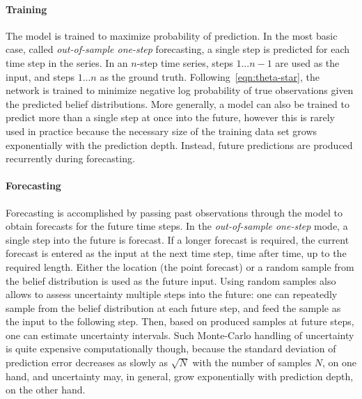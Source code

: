 \documentclass[runningheads]{llncs}
\begin{document}
\paragraph{Training} The model is trained to maximize
probability of prediction. In the most basic case, called
\textit{out-of-sample one-step} forecasting, a single step
is predicted for each time step in the series. In an $n$-step
time series, steps $1 ... n-1$ are used as the input, and steps
$1 ... n$ as the ground truth. Following~\eqref{eqn:theta-star}, the
network is trained to minimize negative log probability of true
observations given the predicted belief distributions. More
generally, a model can also be trained to predict more than a
single step at once into the future, however this is rarely used in
practice because the necessary size of the training data set
grows exponentially with the prediction depth. Instead, future
predictions are produced recurrently during forecasting.

\paragraph{Forecasting} Forecasting is accomplished by passing
past observations through the model to obtain forecasts for the
future time steps. In the \textit{out-of-sample one-step} mode,
a single step into the future is forecast. If a longer forecast
is required, the current forecast is entered as the input at the
next time step, time after time, up to the required length.
Either the location (the point forecast) or a random sample from
the belief distribution is used as the future input. Using
random samples also allows to assess uncertainty multiple steps
into the future: one can repeatedly sample from the belief
distribution at each future step, and feed the sample as the
input to the following step. Then, based on produced samples at
future steps, one can estimate uncertainty intervals. Such
Monte-Carlo handling of uncertainty is quite expensive
computationally though, because the standard deviation of
prediction error decreases as slowly as $\sqrt{N}$
with the number of samples $N$, on one hand, and uncertainty
may, in general, grow exponentially with prediction depth, on
the other hand.
\end{document}
